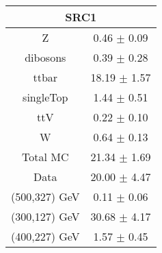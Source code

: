 \begin{tabular}{c|c}
\hline\hline
\multicolumn{2}{c}{\bf SRC1 } \\ \hline 
Z & 0.46 $\pm$ 0.09 \\
dibosons & 0.39 $\pm$ 0.28 \\
ttbar & 18.19 $\pm$ 1.57 \\
singleTop & 1.44 $\pm$ 0.51 \\
ttV & 0.22 $\pm$ 0.10 \\
W & 0.64 $\pm$ 0.13 \\
\hline
Total MC & 21.34 $\pm$ 1.69 \\
Data & 20.00 $\pm$ 4.47 \\
\hline
(500,327) GeV & 0.11 $\pm$ 0.06  \\
\hline
 (300,127) GeV & 30.68 $\pm$ 4.17 \\
\hline
(400,227) GeV & 1.57 $\pm$ 0.45  \\
\hline\hline
\end{tabular}
